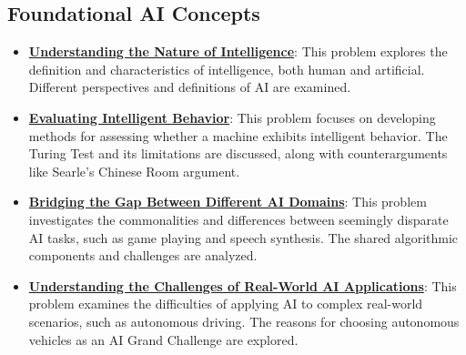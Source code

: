 \documentclass{article}%
\begin{document}
\subsection{Foundational AI Concepts}%
\label{subsec:FoundationalAIConcepts}%
\begin{itemize}[leftmargin=*]%
\item \href{https://purdue.brightspace.com/d2l/common/assets/pdfjs-d2l-dist/1.0.14-legacy/web/viewer.html?file=%2Fcontent%2Fenforced%2F1095467-wl.202510.CS.24300.001%2F02L2-Intro.pdf%3Fou%3D1095467&lang=en-us&container=d2l-fileviewer-rendered-pdf&fullscreen=d2l-fileviewer-rendered-pdf-dialog&height=667#page=5}{\textbf{Understanding the Nature of Intelligence}}: This problem explores the definition and characteristics of intelligence, both human and artificial. Different perspectives and definitions of AI are examined.%
\item \href{https://purdue.brightspace.com/d2l/common/assets/pdfjs-d2l-dist/1.0.14-legacy/web/viewer.html?file=%2Fcontent%2Fenforced%2F1095467-wl.202510.CS.24300.001%2F02L2-Intro.pdf%3Fou%3D1095467&lang=en-us&container=d2l-fileviewer-rendered-pdf&fullscreen=d2l-fileviewer-rendered-pdf-dialog&height=667#page=6}{\textbf{Evaluating Intelligent Behavior}}: This problem focuses on developing methods for assessing whether a machine exhibits intelligent behavior. The Turing Test and its limitations are discussed, along with counterarguments like Searle's Chinese Room argument.%
\item \href{https://purdue.brightspace.com/d2l/common/assets/pdfjs-d2l-dist/1.0.14-legacy/web/viewer.html?file=%2Fcontent%2Fenforced%2F1095467-wl.202510.CS.24300.001%2F02L2-Intro.pdf%3Fou%3D1095467&lang=en-us&container=d2l-fileviewer-rendered-pdf&fullscreen=d2l-fileviewer-rendered-pdf-dialog&height=667#page=31}{\textbf{Bridging the Gap Between Different AI Domains}}: This problem investigates the commonalities and differences between seemingly disparate AI tasks, such as game playing and speech synthesis. The shared algorithmic components and challenges are analyzed.%
\item \href{https://purdue.brightspace.com/d2l/common/assets/pdfjs-d2l-dist/1.0.14-legacy/web/viewer.html?file=%2Fcontent%2Fenforced%2F1095467-wl.202510.CS.24300.001%2F02L2-Intro.pdf%3Fou%3D1095467&lang=en-us&container=d2l-fileviewer-rendered-pdf&fullscreen=d2l-fileviewer-rendered-pdf-dialog&height=667#page=43}{\textbf{Understanding the Challenges of Real-World AI Applications}}: This problem examines the difficulties of applying AI to complex real-world scenarios, such as autonomous driving. The reasons for choosing autonomous vehicles as an AI Grand Challenge are explored.%

\end{itemize}
\end{document}
